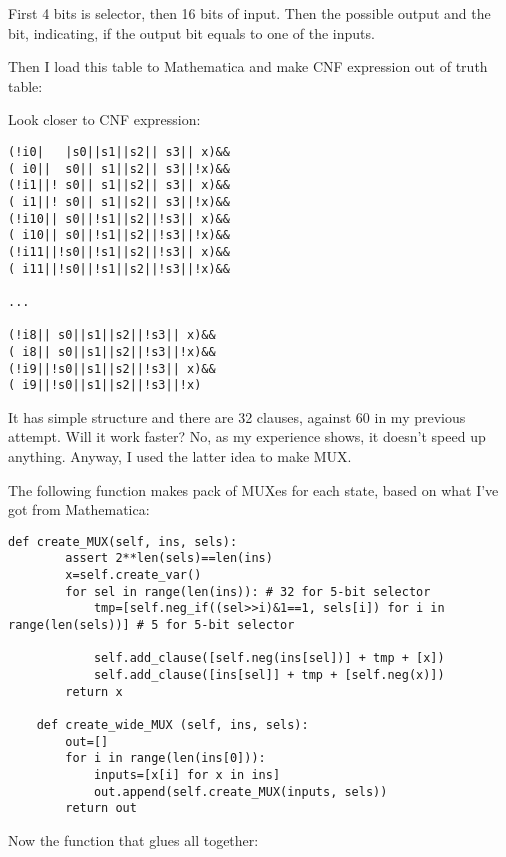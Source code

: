 First 4 bits is selector, then 16 bits of input.
Then the possible output and the bit, indicating, if the output bit equals to one of the inputs.

Then I load this table to Mathematica and make CNF expression out of truth table:


%

Look closer to CNF expression:

\begin{lstlisting}
(!i0|   |s0||s1||s2|| s3|| x)&&
( i0||  s0|| s1||s2|| s3||!x)&&
(!i1||! s0|| s1||s2|| s3|| x)&&
( i1||! s0|| s1||s2|| s3||!x)&&
(!i10|| s0||!s1||s2||!s3|| x)&&
( i10|| s0||!s1||s2||!s3||!x)&&
(!i11||!s0||!s1||s2||!s3|| x)&&
( i11||!s0||!s1||s2||!s3||!x)&&

...

(!i8|| s0||s1||s2||!s3|| x)&&
( i8|| s0||s1||s2||!s3||!x)&&
(!i9||!s0||s1||s2||!s3|| x)&&
( i9||!s0||s1||s2||!s3||!x)
\end{lstlisting}

It has simple structure and there are 32 clauses, against 60 in my previous attempt.
Will it work faster?
No, as my experience shows, it doesn't speed up anything.
Anyway, I used the latter idea to make MUX.

The following function makes pack of MUXes for each state, based on what I've got from Mathematica:

\begin{lstlisting}[style=custompy]
    def create_MUX(self, ins, sels):
        assert 2**len(sels)==len(ins)
        x=self.create_var()
        for sel in range(len(ins)): # 32 for 5-bit selector
            tmp=[self.neg_if((sel>>i)&1==1, sels[i]) for i in range(len(sels))] # 5 for 5-bit selector
    
            self.add_clause([self.neg(ins[sel])] + tmp + [x])
            self.add_clause([ins[sel]] + tmp + [self.neg(x)])
        return x
    
    def create_wide_MUX (self, ins, sels):
        out=[]
        for i in range(len(ins[0])):
            inputs=[x[i] for x in ins]
            out.append(self.create_MUX(inputs, sels))
        return out
\end{lstlisting}


Now the function that glues all together:

